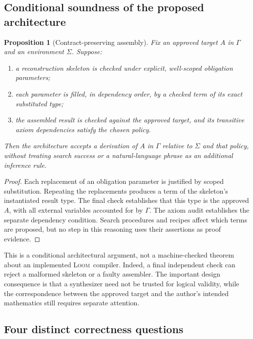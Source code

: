 \documentclass[11pt,letterpaper]{article}
\newcommand{\Loom}{\textsc{Loom}}
\newtheorem{proposition}{Proposition}[section]
\theoremstyle{remark}
\begin{document}
\subsection{Conditional soundness of the proposed architecture}

\begin{proposition}[Contract-preserving assembly]
Fix an approved target $A$ in $\Gamma$ and an environment $\Sigma$. Suppose:
\begin{enumerate}
\item a reconstruction skeleton is checked under explicit, well-scoped obligation parameters;
\item each parameter is filled, in dependency order, by a checked term of its exact substituted type;
\item the assembled result is checked against the approved target, and its transitive axiom dependencies satisfy the chosen policy.
\end{enumerate}
Then the architecture accepts a derivation of $A$ in $\Gamma$ relative to $\Sigma$ and that policy, without treating search success or a natural-language phrase as an additional inference rule.
\end{proposition}
\begin{proof}
Each replacement of an obligation parameter is justified by scoped substitution. Repeating the replacements produces a term of the skeleton's instantiated result type. The final check establishes that this type is the approved $A$, with all external variables accounted for by $\Gamma$. The axiom audit establishes the separate dependency condition. Search procedures and recipes affect which terms are proposed, but no step in this reasoning uses their assertions as proof evidence.
\end{proof}

This is a conditional architectural argument, not a machine-checked theorem about an implemented \Loom\ compiler. Indeed, a final independent check can reject a malformed skeleton or a faulty assembler. The important design consequence is that a synthesizer need not be trusted for logical validity, while the correspondence between the approved target and the author's intended mathematics still requires separate attention.

\subsection{Four distinct correctness questions}
\end{document}
